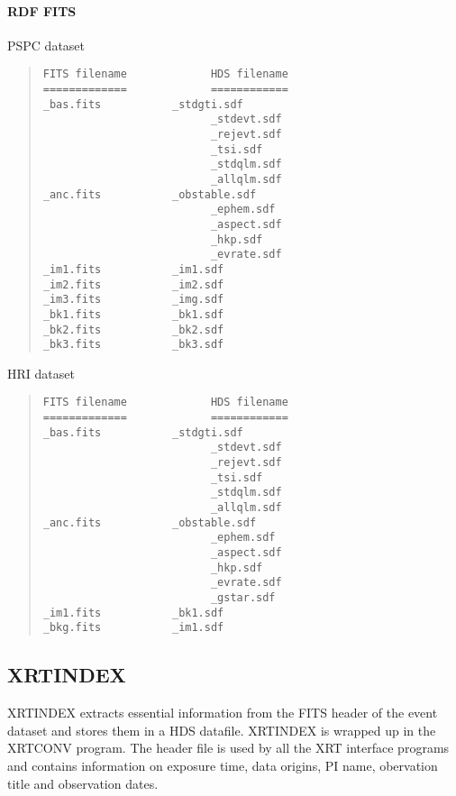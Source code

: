 \documentclass{book}
\renewcommand{\_}{{\tt\char'137}}     %
\begin{document}
\paragraph{RDF FITS}
PSPC dataset
\begin{quote}\begin{verbatim}
FITS filename             HDS filename
=============             ============
_bas.fits           _stdgti.sdf
                          _stdevt.sdf
                          _rejevt.sdf
                          _tsi.sdf
                          _stdqlm.sdf
                          _allqlm.sdf
_anc.fits           _obstable.sdf
                          _ephem.sdf
                          _aspect.sdf
                          _hkp.sdf
                          _evrate.sdf
_im1.fits           _im1.sdf
_im2.fits           _im2.sdf
_im3.fits           _img.sdf
_bk1.fits           _bk1.sdf
_bk2.fits           _bk2.sdf
_bk3.fits           _bk3.sdf
\end{verbatim}\end{quote}
HRI dataset
\begin{quote}\begin{verbatim}
FITS filename             HDS filename
=============             ============
_bas.fits           _stdgti.sdf
                          _stdevt.sdf
                          _rejevt.sdf
                          _tsi.sdf
                          _stdqlm.sdf
                          _allqlm.sdf
_anc.fits           _obstable.sdf
                          _ephem.sdf
                          _aspect.sdf
                          _hkp.sdf
                          _evrate.sdf
                          _gstar.sdf
_im1.fits           _bk1.sdf
_bkg.fits           _im1.sdf
\end{verbatim}\end{quote}
\subsection{XRTINDEX}
XRTINDEX extracts essential information from the FITS header of the event
dataset and stores them in a HDS datafile. XRTINDEX is wrapped up in the
XRTCONV program. The header file is used by all the XRT interface
programs and contains information on exposure time, data origins, PI name,
obervation title and observation dates.
 
\end{document}
